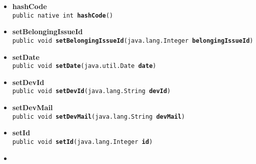 {{{\begin{itemize}
{\texttt{public java.lang.String\ {\bf  getText}()
\label{it.unisa.sesa.repominer.db.entities.IssueComment.getText()}}%
}%
\item{ 
\hypertarget{it.unisa.sesa.repominer.db.entities.IssueComment.hashCode()}{{\bf  hashCode}\\}
\texttt{public native int\ {\bf  hashCode}()
\label{it.unisa.sesa.repominer.db.entities.IssueComment.hashCode()}}%
}%
\item{ 
\hypertarget{it.unisa.sesa.repominer.db.entities.IssueComment.setBelongingIssueId(java.lang.Integer)}{{\bf  setBelongingIssueId}\\}
\texttt{public void\ {\bf  setBelongingIssueId}(\texttt{java.lang.Integer} {\bf  belongingIssueId})
\label{it.unisa.sesa.repominer.db.entities.IssueComment.setBelongingIssueId(java.lang.Integer)}}%
}%
\item{ 
\hypertarget{it.unisa.sesa.repominer.db.entities.IssueComment.setDate(java.util.Date)}{{\bf  setDate}\\}
\texttt{public void\ {\bf  setDate}(\texttt{java.util.Date} {\bf  date})
\label{it.unisa.sesa.repominer.db.entities.IssueComment.setDate(java.util.Date)}}%
}%
\item{ 
\hypertarget{it.unisa.sesa.repominer.db.entities.IssueComment.setDevId(java.lang.String)}{{\bf  setDevId}\\}
\texttt{public void\ {\bf  setDevId}(\texttt{java.lang.String} {\bf  devId})
\label{it.unisa.sesa.repominer.db.entities.IssueComment.setDevId(java.lang.String)}}%
}%
\item{ 
\hypertarget{it.unisa.sesa.repominer.db.entities.IssueComment.setDevMail(java.lang.String)}{{\bf  setDevMail}\\}
\texttt{public void\ {\bf  setDevMail}(\texttt{java.lang.String} {\bf  devMail})
\label{it.unisa.sesa.repominer.db.entities.IssueComment.setDevMail(java.lang.String)}}%
}%
\item{ 
\hypertarget{it.unisa.sesa.repominer.db.entities.IssueComment.setId(java.lang.Integer)}{{\bf  setId}\\}
\texttt{public void\ {\bf  setId}(\texttt{java.lang.Integer} {\bf  id})
\label{it.unisa.sesa.repominer.db.entities.IssueComment.setId(java.lang.Integer)}}%
}%
\item{ 
}
\end{itemize}}}}
